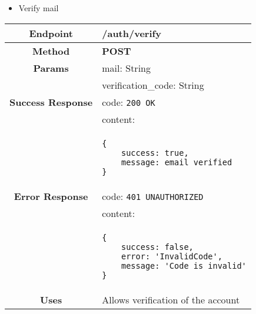     \begin{itemize}
        \item Verify mail
    \end{itemize}
    \begin{adjustwidth}{1cm}{}
        \begin{tabular}{|c|l|}
            \hline
            \textbf{Endpoint} & /auth/verify \\
            \hline
            \textbf{Method} & \textbf{POST} \\
            \hline
            \textbf{Params} & mail: String \\
            &                 verification\_code: String \\
            \hline
            \textbf{Success Response} & code: \texttt{200 OK} \\
            &                           content: \\
            & \begin{minipage}[t]{0.5\textwidth}
                \begin{adjustwidth}{1.5cm}{}
                \begin{verbatim}
{
    success: true, 
    message: email verified
}
                \end{verbatim}
                \end{adjustwidth}
              \end{minipage} \\
              \hline
            \textbf{Error Response} & code: \texttt{401 UNAUTHORIZED} \\
            &                         content: \\
            & \begin{minipage}[t]{0.7\textwidth}
                \begin{adjustwidth}{1.5cm}{}
                \begin{verbatim}
{
    success: false, 
    error: 'InvalidCode',
    message: 'Code is invalid'
}
                \end{verbatim}
                \end{adjustwidth}
              \end{minipage} \\
              \hline
            \textbf{Uses} & Allows verification of the account \\
            \hline
        \end{tabular}
    \end{adjustwidth}
    
